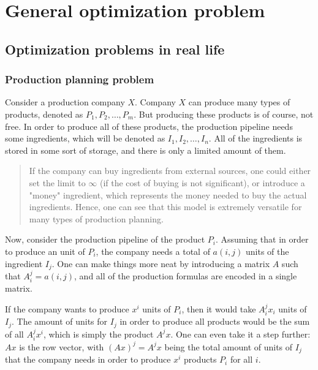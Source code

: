 \chapter{General optimization problem} %
\label{chap:General optimization problem}

\section{Optimization problems in real life} %
\label{sec:Optimization problems in real life}

\subsection{Production planning problem} %
\label{sub:Production planning problem}

Consider a production company \( X \). Company \( X \) can produce many types of
products, denoted as \( P_{1}, P_{2}, \ldots , P_{m} \). But producing
these products is of course, not free. In order to produce all of these
products, the production pipeline needs some ingredients, which will be denoted
as \( I_{1}, I_{2}, \ldots , I_{n} \). All of the ingredients is stored in some
sort of storage, and there is only a limited amount of them.

\begin{quote}
  If the company can buy ingredients from external sources, one could either set
  the limit to \( \infty \) (if the cost of buying is not significant), or
  introduce a "money" ingredient, which represents the money needed to buy the
  actual ingredients. Hence, one can see that this model is extremely versatile
  for many types of production planning.
\end{quote}

Now, consider the production pipeline of the product \( P_{i} \). Assuming that
in order to produce an unit of \( P_{i} \), the company needs a total of \( a(i,
j) \) units of the ingredient \( I_{j} \). One can make things more neat by
introducing a matrix \( A \) such that \( A^{j}_{i} = a(i, j) \), and all of the
production formulas are encoded in a single matrix.

If the company wants to produce \( x^{i} \) units of \( P_{i} \), then it would
take \( A^{j}_{i}x_{i} \) units of \( I_{j} \). The amount of units for \(
I_{j}\) in order to produce all products would be the sum of all \(
A^{j}_{i}x^{i} \), which is simply the product \( A^{j}x \). One can even take
it a step further: \( Ax \) is the row vector, with \( (Ax)^{j} = A^{j}x \)
being the total amount of units of \( I_{j} \) that the company needs in order
to produce \( x^{i} \) products \( P_{i} \) for all \( i \).

